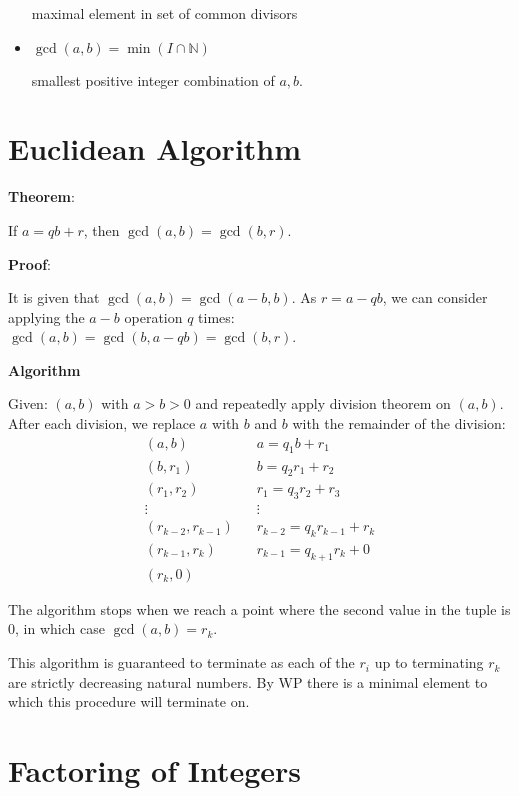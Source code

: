 \documentclass{article}
\begin{document}
\begin{multicols*}{2}
\begin{itemize}
    maximal element in set of common divisors
    \item $\gcd(a, b) = \min(I \cap \mathbb{N})$
    
    smallest positive integer combination of $a, b$.
    
\end{itemize}

\section{Euclidean Algorithm}

\textbf{Theorem}:

If $a = qb + r$, then $\gcd(a, b) = \gcd(b, r)$.

\textbf{Proof}:

It is given that $\gcd(a, b) = \gcd(a - b, b)$. As $r = a - qb$, we can consider applying the $a - b$ operation $q$ times: $\gcd(a, b) = \gcd(b, a - qb) = \gcd(b, r)$.

\textbf{Algorithm}

Given: $(a, b)$ with $a > b > 0$ and repeatedly apply division theorem on $(a, b)$. After each division, we replace $a$ with $b$ and $b$ with the remainder of the division:\[\begin{aligned}
    (a, b) \;\;\;& a  = q_1b + r_1 \\
    (b, r_1) \;\;\;& b  = q_2r_1 + r_2 \\
    (r_1, r_2) \;\;\;& r_1  = q_3r_2 + r_3 \\
    \vdots \;\;\;& \vdots \\
    (r_{k-2},r_{k-1}) \;\;\;& r_{k-2} = q_kr_{k-1}+ r_k \\
    (r_{k-1}, r_k) \;\;\;& r_{k-1} = q_{k+1}r_{k}+ 0 \\
    (r_k, 0) \;\;\;& 
\end{aligned}\]

The algorithm stops when we reach a point where the second value in the tuple is $0$, in which case $\gcd(a, b) = r_k$.

This algorithm is guaranteed to terminate as each of the $r_i$ up to terminating $r_k$ are strictly decreasing natural numbers. By WP there is a minimal element to which this procedure will terminate on.


\section{Factoring of Integers}


\end{multicols*}
\end{document}
